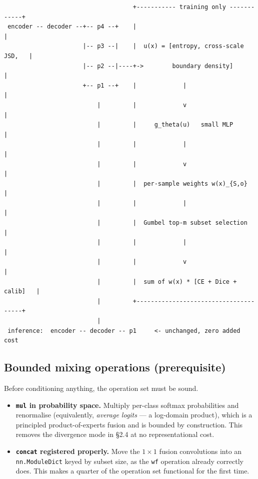 \documentclass[11pt,a4paper]{article}
\newcommand{\code}[1]{\texttt{\small #1}}
\begin{document}
\begin{lstlisting}
                                    +----------- training only ------------+
 encoder -- decoder --+-- p4 --+    |                                      |
                      |-- p3 --|    |  u(x) = [entropy, cross-scale JSD,   |
                      |-- p2 --|----+->        boundary density]           |
                      +-- p1 --+    |             |                        |
                          |         |             v                        |
                          |         |     g_theta(u)   small MLP           |
                          |         |             |                        |
                          |         |             v                        |
                          |         |  per-sample weights w(x)_{S,o}       |
                          |         |             |                        |
                          |         |  Gumbel top-m subset selection       |
                          |         |             |                        |
                          |         |             v                        |
                          |         |  sum of w(x) * [CE + Dice + calib]   |
                          |         +--------------------------------------+
                          |
 inference:  encoder -- decoder -- p1     <- unchanged, zero added cost
\end{lstlisting}

\subsection{Bounded mixing operations (prerequisite)}

Before conditioning anything, the operation set must be sound.

\begin{itemize}
\item \textbf{\code{mul} in probability space.} Multiply per-class softmax
probabilities and renormalise (equivalently, \emph{average logits} --- a
log-domain product), which is a principled product-of-experts fusion and is
bounded by construction. This removes the divergence mode in \S2.4 at no
representational cost.
\item \textbf{\code{concat} registered properly.} Move the $1\times1$ fusion
convolutions into an \code{nn.ModuleDict} keyed by subset size, as the \code{wf}
operation already correctly does. This makes a quarter of the operation set
functional for the first time.
\end{itemize}
\end{document}
